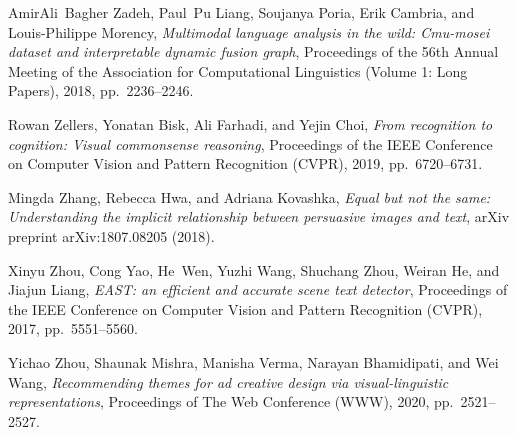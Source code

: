 \documentclass{zapiski}
\begin{document}
\begin{thebibliography}{10}
AmirAli~Bagher Zadeh, Paul~Pu Liang, Soujanya Poria, Erik Cambria, and
  Louis-Philippe Morency, \emph{Multimodal language analysis in the wild:
  Cmu-mosei dataset and interpretable dynamic fusion graph}, Proceedings of the
  56th Annual Meeting of the Association for Computational Linguistics (Volume
  1: Long Papers), 2018, pp.~2236--2246.

Rowan Zellers, Yonatan Bisk, Ali Farhadi, and Yejin Choi, \emph{From
  recognition to cognition: Visual commonsense reasoning}, Proceedings of the
  IEEE Conference on Computer Vision and Pattern Recognition (CVPR), 2019,
  pp.~6720--6731.

Mingda Zhang, Rebecca Hwa, and Adriana Kovashka, \emph{Equal but not the same:
  Understanding the implicit relationship between persuasive images and text},
  arXiv preprint arXiv:1807.08205 (2018).

Xinyu Zhou, Cong Yao, He~Wen, Yuzhi Wang, Shuchang Zhou, Weiran He, and Jiajun
  Liang, \emph{{EAST}: an efficient and accurate scene text detector},
  Proceedings of the IEEE Conference on Computer Vision and Pattern Recognition
  (CVPR), 2017, pp.~5551--5560.

Yichao Zhou, Shaunak Mishra, Manisha Verma, Narayan Bhamidipati, and Wei Wang,
  \emph{Recommending themes for ad creative design via visual-linguistic
  representations}, Proceedings of The Web Conference (WWW), 2020,
  pp.~2521--2527.

\end{thebibliography}
\end{document}
